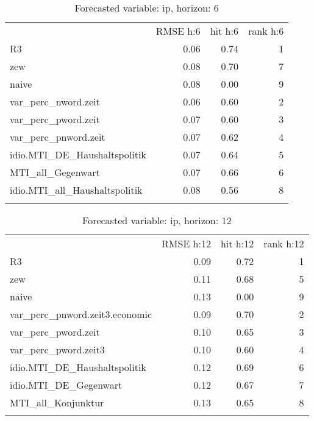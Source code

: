 \documentclass[11pt,]{article}
\begin{document}
\begin{longtable}[c]{@{}lrrr@{}}
\toprule\addlinespace
& RMSE h:6 & hit h:6 & rank h:6
\\\addlinespace
\midrule\endhead
R3 & 0.06 & 0.74 & 1
\\\addlinespace
zew & 0.08 & 0.70 & 7
\\\addlinespace
naive & 0.08 & 0.00 & 9
\\\addlinespace
var\_perc\_nword.zeit & 0.06 & 0.60 & 2
\\\addlinespace
var\_perc\_pword.zeit & 0.07 & 0.60 & 3
\\\addlinespace
var\_perc\_pnword.zeit & 0.07 & 0.62 & 4
\\\addlinespace
idio.MTI\_DE\_Haushaltspolitik & 0.07 & 0.64 & 5
\\\addlinespace
MTI\_all\_Gegenwart & 0.07 & 0.66 & 6
\\\addlinespace
idio.MTI\_all\_Haushaltspolitik & 0.08 & 0.56 & 8
\\\addlinespace
\bottomrule
\addlinespace
\caption{Forecasted variable: ip, horizon: 6}
\end{longtable}

\begin{longtable}[c]{@{}lrrr@{}}
\toprule\addlinespace
& RMSE h:12 & hit h:12 & rank h:12
\\\addlinespace
\midrule\endhead
R3 & 0.09 & 0.72 & 1
\\\addlinespace
zew & 0.11 & 0.68 & 5
\\\addlinespace
naive & 0.13 & 0.00 & 9
\\\addlinespace
var\_perc\_pnword.zeit3.economic & 0.09 & 0.70 & 2
\\\addlinespace
var\_perc\_pword.zeit & 0.10 & 0.65 & 3
\\\addlinespace
var\_perc\_pword.zeit3 & 0.10 & 0.60 & 4
\\\addlinespace
idio.MTI\_DE\_Haushaltspolitik & 0.12 & 0.69 & 6
\\\addlinespace
idio.MTI\_DE\_Gegenwart & 0.12 & 0.67 & 7
\\\addlinespace
MTI\_all\_Konjunktur & 0.13 & 0.65 & 8
\\\addlinespace
\bottomrule
\addlinespace
\caption{Forecasted variable: ip, horizon: 12}
\end{longtable}
\end{document}

